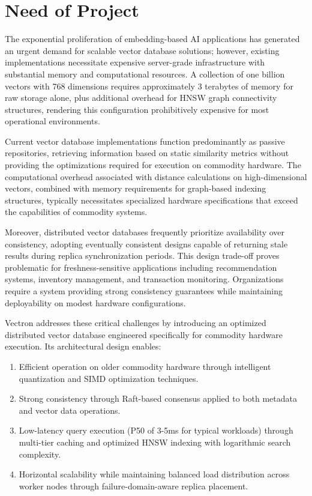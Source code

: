 \section{Need of Project}

The exponential proliferation of embedding-based AI applications has generated an urgent demand for scalable vector database solutions; however, existing implementations necessitate expensive server-grade infrastructure with substantial memory and computational resources. A collection of one billion vectors with 768 dimensions requires approximately 3 terabytes of memory for raw storage alone, plus additional overhead for HNSW graph connectivity structures, rendering this configuration prohibitively expensive for most operational environments.

Current vector database implementations function predominantly as passive repositories, retrieving information based on static similarity metrics without providing the optimizations required for execution on commodity hardware. The computational overhead associated with distance calculations on high-dimensional vectors, combined with memory requirements for graph-based indexing structures, typically necessitates specialized hardware specifications that exceed the capabilities of commodity systems.

Moreover, distributed vector databases frequently prioritize availability over consistency, adopting eventually consistent designs capable of returning stale results during replica synchronization periods. This design trade-off proves problematic for freshness-sensitive applications including recommendation systems, inventory management, and transaction monitoring. Organizations require a system providing strong consistency guarantees while maintaining deployability on modest hardware configurations.

Vectron addresses these critical challenges by introducing an optimized distributed vector database engineered specifically for commodity hardware execution. Its architectural design enables:

\begin{enumerate}
    \item Efficient operation on older commodity hardware through intelligent quantization and SIMD optimization techniques.
    \item Strong consistency through Raft-based consensus applied to both metadata and vector data operations.
    \item Low-latency query execution (P50 of 3-5ms for typical workloads) through multi-tier caching and optimized HNSW indexing with logarithmic search complexity.
    \item Horizontal scalability while maintaining balanced load distribution across worker nodes through failure-domain-aware replica placement.
\end{enumerate}

